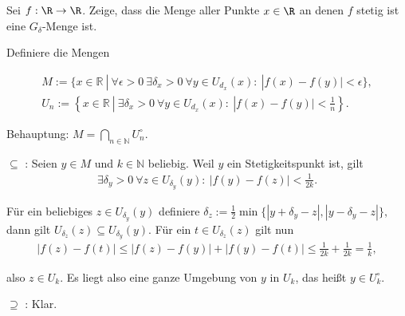 \begin{exercise}
Sei $f: \R \rightarrow \R$. Zeige, dass die Menge aller Punkte $x \in \R$ an
denen $f$ stetig ist eine $G_{\delta}$-Menge ist.
\end{exercise}
\begin{solution}
  Definiere die Mengen

  \begin{align*}
  M := \{x \in \mathbb{R} ~|~ \forall \epsilon > 0 ~\exists \delta_x > 0 ~\forall y \in U_{d_x}(x): ~|f(x)-f(y)| < \epsilon\}, \\
  U_n := \left\{x \in \mathbb{R} ~|~ \exists \delta_x > 0 ~\forall y \in U_{d_x}(x): ~|f(x)-f(y)| < \frac{1}{n}\right\}.
  \end{align*}

  Behauptung: $M = \bigcap_{n \in \mathbb{N}} U_n^\circ.$

  \glqq $\subseteq$ \grqq: Seien $y \in M$ und $k \in \mathbb{N}$ beliebig. Weil $y$ ein Stetigkeitspunkt ist, gilt
  \begin{align*}
      \exists \delta_y > 0 ~\forall z \in U_{\delta_y}(y): ~|f(y)-f(z)| < \frac{1}{2k}.
  \end{align*}

  Für ein beliebiges $z \in U_{\delta_y}(y)$ definiere $\delta_z := \frac{1}{2} \min\{|y + \delta_y - z|, |y - \delta_y - z|\},$ dann gilt $U_{\delta_z}(z) \subseteq U_{\delta_y}(y).$ Für ein $t \in U_{\delta_z}(z)$ gilt nun
  \begin{align*}
      |f(z)-f(t)| \leq |f(z)-f(y)| + |f(y)-f(t)| \leq \frac{1}{2k} + \frac{1}{2k} = \frac{1}{k},
  \end{align*}

  also $z \in U_k$. Es liegt also eine ganze Umgebung von $y$ in $U_k$, das heißt $y \in U_k^\circ.$


  \glqq$\supseteq$ \grqq: Klar.
\end{solution}
